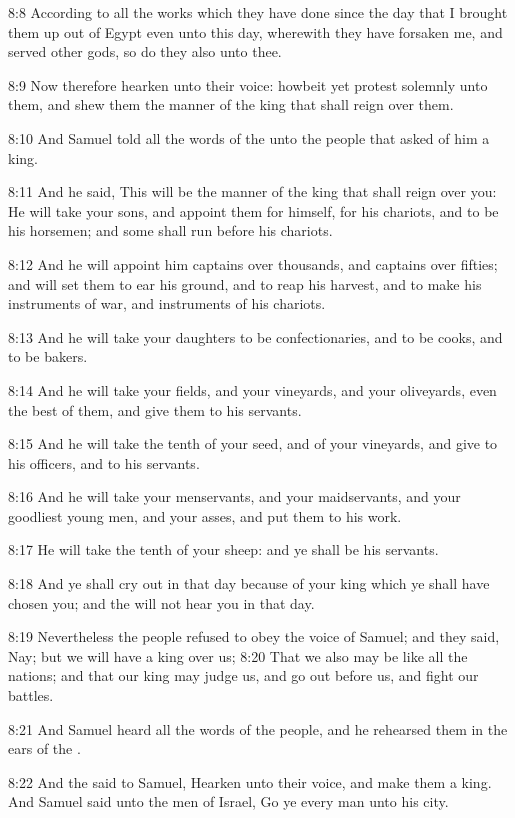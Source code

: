 8:8 According to all the works which they have done since the day that
I brought them up out of Egypt even unto this day, wherewith they have
forsaken me, and served other gods, so do they also unto thee.

8:9 Now therefore hearken unto their voice: howbeit yet protest
solemnly unto them, and shew them the manner of the king that shall
reign over them.

8:10 And Samuel told all the words of the \LORD unto the people that
asked of him a king.

8:11 And he said, This will be the manner of the king that shall reign
over you: He will take your sons, and appoint them for himself, for
his chariots, and to be his horsemen; and some shall run before his
chariots.

8:12 And he will appoint him captains over thousands, and captains
over fifties; and will set them to ear his ground, and to reap his
harvest, and to make his instruments of war, and instruments of his
chariots.

8:13 And he will take your daughters to be confectionaries, and to be
cooks, and to be bakers.

8:14 And he will take your fields, and your vineyards, and your
oliveyards, even the best of them, and give them to his servants.

8:15 And he will take the tenth of your seed, and of your vineyards,
and give to his officers, and to his servants.

8:16 And he will take your menservants, and your maidservants, and
your goodliest young men, and your asses, and put them to his work.

8:17 He will take the tenth of your sheep: and ye shall be his
servants.

8:18 And ye shall cry out in that day because of your king which ye
shall have chosen you; and the \LORD will not hear you in that day.

8:19 Nevertheless the people refused to obey the voice of Samuel; and
they said, Nay; but we will have a king over us; 8:20 That we also may
be like all the nations; and that our king may judge us, and go out
before us, and fight our battles.

8:21 And Samuel heard all the words of the people, and he rehearsed
them in the ears of the \LORD.

8:22 And the \LORD said to Samuel, Hearken unto their voice, and make
them a king. And Samuel said unto the men of Israel, Go ye every man
unto his city.

